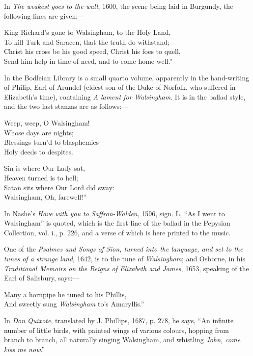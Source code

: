 In \textit{The weakest goes to the wall}, 1600, the scene being laid in Burgundy, the
following lines are given:—
\begin{scverse}
King Richard’s gone to Walsingham, to the Holy Land,\\
To kill Turk and Saracen, that the truth do withstand;\\
Christ his cross be his good speed, Christ his foes to quell,\\
Send him help in time of need, and to come home well.”
\end{scverse}
In the Bodleian Library is a small quarto volume, apparently in the hand-writing
of Philip, Earl of Arundel (eldest son of the Duke of Norfolk, who suffered in
Elizabeth’s time), containing \textit{A lament for Walsingham}. It is in the ballad style,
and the two last stanzas are as follows:—
\settowidth{\versewidth}{Weep, weep, 0 Walsingham!}
\begin{dcverse}
Weep, weep, O Walsingham!\\
Whose days are nights;\\
Blessings turn’d to blasphemies—\\
Holy deeds to despites.

Sin is where Our Lady sat,\\
Heaven turned is to hell;\\
Satan sits where Our Lord did sway:\\
Walsingham, Oh, farewell!”
\end{dcverse}
In Nashe’s \textit{Have with you to Saffron-Walden}, 1596, sign. L, “As I went to
Walsingham” is quoted, which is the first line of the ballad in the Pepysian
Collection, vol. i., p. 226, and a verse of which is here printed to the music.

One of the \textit{Psalmes and Songs of Sion, turned into the language, and set to the
tunes of a strange land}, 1642, is to the tune of \textit{Walsingham}; and Osborne, in his
\textit{Traditional Memoirs on the Reigns of Elizabeth and James}, 1653, speaking of the
Earl of Salisbury, says:—
\settowidth{\versewidth}{Many a hornpipe he tuned to his Phillis,}
\begin{scverse}
Many a hornpipe he tuned to his Phillis,\\
And sweetly sung \textit{Walsingham} to’s Amaryllis.”
\end{scverse}
In \textit{Don Quixote}, translated by J. Phillips, 1687, p. 278, he says, “An infinite
number of little birds, with painted wings of various colours, hopping from branch
to branch, all naturally singing Walsingham, and whistling \textit{John, come kiss
me now}.”

